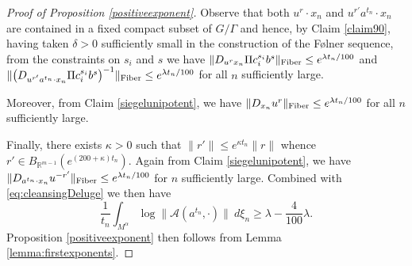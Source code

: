 \documentclass[10pt,reqno]{amsart}
\theoremstyle{Theorem}
\theoremstyle{definition}
\theoremstyle{remark}
\newcommand{\td}{\tilde}
\def\Fib{\mathrm{Fiber}}
\newcommand{\R}{\mathbb {R}}
\def\calA{\mathcal A}
\renewcommand\P{\mathbb{P}}
\def\Folner{F{\o}lner }
\def\blue{}
\begin{document}
{\begin{proof}[Proof of Proposition \ref{positiveexponent}]













Observe that both  $u^r\cdot  x_n$ and $ u^{r'}a^{t_n}\cdot x_n$ are contained in a fixed compact subset of  $G/\Gamma$ and hence, by Claim \ref{claim90}, having taken $\delta>0$ sufficiently small in the construction of the \Folner sequence, from the constraints on $s_i$ and $s$ we have  $\|D_{u^{r}x_n}\Pi  c_i^{s_i}b^s\|_{\text{Fiber}}\le  e^{\lambda t_n/100}$  and $\|\big(D_{u^{r'}a^{t_n}\cdot x_n}\Pi  c_i^{s_i}b^s\big)^{\blue -1}\|_\fib\le  e^{\lambda t_n/100}$ for all $n$ sufficiently large.

Moreover, from Claim  \ref{siegelunipotent},  we have $\|D_{x_n}u^r \|_{\text{Fiber}}\le e^{\lambda t_n/100}$  for all $n$ sufficiently large.

Finally, there exists $\kappa>0$ such that $\|r'\| \le e^{\kappa t_n} \|r\|$ whence $r'\in   B_{\R^{m-1}}(e^{(200+\kappa)t_n})$.  Again   from Claim  \ref{siegelunipotent},
 we have $\|D_{a^{t_n}\cdot x_n}u^{\blue -r'} \|_\fib\le e^{\lambda t_n/100}$   for $n$ sufficiently large.
 Combined with  \eqref{eq:cleansingDeluge} we then have
\[\frac{1}{t_n} \int_{M^\alpha }   {\log  \|\calA(a ^{t_n},\cdot) \|  \ d \xi_n}   \ge \lambda- \frac 4{100} \lambda. \]
 Proposition \ref{positiveexponent} then follows from  Lemma \ref{lemma:firstexponents}.
\end{proof}







}
\end{document}
